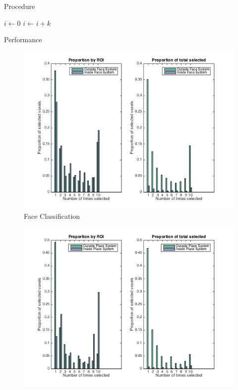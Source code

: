 \documentclass[final]{beamer}
\newlength{\introcolwid}
\begin{document}
\begin{frame}[t]
\begin{columns}[t]
\begin{column}{\introcolwid}
   		\begin{block}{Procedure}
				\begin{algorithmic}
					\State $i\gets 0$
					\Else
					\State $i\gets i+k$
					\EndIf
					\EndIf
				\end{algorithmic}
  		\end{block}
  		\begin{block}{Performance}
			\begin{figure}
				\includegraphics[width=\textwidth]{figures/Faces_WithinBeyond.png}
				\caption{Face Classification}
			\end{figure}			
			\begin{figure}
				\includegraphics[width=\textwidth]{figures/Places_WithinBeyond.png}

\end{figure}
\end{block}
\end{column}
\end{columns}
\end{frame}
\end{document}
